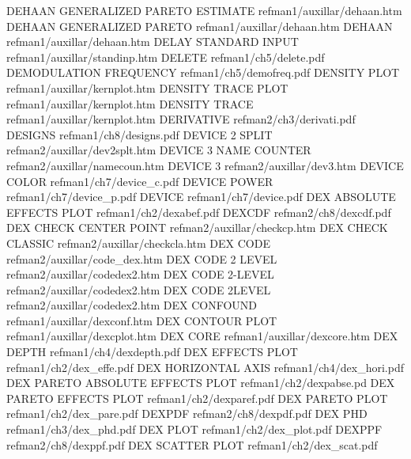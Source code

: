 DEHAAN GENERALIZED PARETO  ESTIMATE     refman1/auxillar/dehaan.htm
DEHAAN GENERALIZED PARETO               refman1/auxillar/dehaan.htm
DEHAAN                                  refman1/auxillar/dehaan.htm
DELAY STANDARD INPUT                    refman1/auxillar/standinp.htm
DELETE                                  refman1/ch5/delete.pdf
DEMODULATION FREQUENCY                  refman1/ch5/demofreq.pdf
DENSITY PLOT                            refman1/auxillar/kernplot.htm
DENSITY TRACE PLOT                      refman1/auxillar/kernplot.htm
DENSITY TRACE                           refman1/auxillar/kernplot.htm
DERIVATIVE                              refman2/ch3/derivati.pdf
DESIGNS                                 refman1/ch8/designs.pdf
DEVICE 2 SPLIT                          refman2/auxillar/dev2splt.htm
DEVICE 3 NAME COUNTER                   refman2/auxillar/namecoun.htm
DEVICE 3                                refman2/auxillar/dev3.htm
DEVICE COLOR                            refman1/ch7/device_c.pdf
DEVICE POWER                            refman1/ch7/device_p.pdf
DEVICE                                  refman1/ch7/device.pdf
DEX ABSOLUTE EFFECTS PLOT               refman1/ch2/dexabef.pdf
DEXCDF                                  refman2/ch8/dexcdf.pdf
DEX CHECK CENTER POINT                  refman2/auxillar/checkcp.htm
DEX CHECK CLASSIC                       refman2/auxillar/checkcla.htm
DEX CODE                                refman2/auxillar/code_dex.htm
DEX CODE 2 LEVEL                        refman2/auxillar/codedex2.htm
DEX CODE 2-LEVEL                        refman2/auxillar/codedex2.htm
DEX CODE 2LEVEL                         refman2/auxillar/codedex2.htm
DEX CONFOUND                            refman1/auxillar/dexconf.htm
DEX CONTOUR PLOT                        refman1/auxillar/dexcplot.htm
DEX CORE                                refman1/auxillar/dexcore.htm
DEX DEPTH                               refman1/ch4/dexdepth.pdf
DEX EFFECTS PLOT                        refman1/ch2/dex_effe.pdf
DEX HORIZONTAL AXIS                     refman1/ch4/dex_hori.pdf
DEX PARETO ABSOLUTE EFFECTS PLOT        refman1/ch2/dexpabse.pd
DEX PARETO EFFECTS PLOT                 refman1/ch2/dexparef.pdf
DEX PARETO PLOT                         refman1/ch2/dex_pare.pdf
DEXPDF                                  refman2/ch8/dexpdf.pdf
DEX PHD                                 refman1/ch3/dex_phd.pdf
DEX PLOT                                refman1/ch2/dex_plot.pdf
DEXPPF                                  refman2/ch8/dexppf.pdf
DEX SCATTER PLOT                        refman1/ch2/dex_scat.pdf
